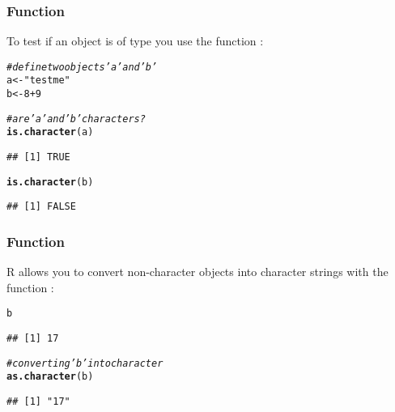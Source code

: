 \documentclass[12pt]{beamer}\usepackage[]{graphicx}\usepackage[]{color}
\makeatletter
\newcommand{\hlnum}[1]{\textcolor[rgb]{0.686,0.059,0.569}{#1}}%
\newcommand{\hlstr}[1]{\textcolor[rgb]{0.192,0.494,0.8}{#1}}%
\newcommand{\hlcom}[1]{\textcolor[rgb]{0.678,0.584,0.686}{\textit{#1}}}%
\newcommand{\hlopt}[1]{\textcolor[rgb]{0,0,0}{#1}}%
\newcommand{\hlstd}[1]{\textcolor[rgb]{0.345,0.345,0.345}{#1}}%
\newcommand{\hlkwb}[1]{\textcolor[rgb]{0.69,0.353,0.396}{#1}}%
\newcommand{\hlkwd}[1]{\textcolor[rgb]{0.737,0.353,0.396}{\textbf{#1}}}%
\newenvironment{kframe}{%
 \def\at@end@of@kframe{}%
 \ifinner\ifhmode%
  \def\at@end@of@kframe{\end{minipage}}%
  \begin{minipage}{\columnwidth}%
 \fi\fi%
 \def\FrameCommand##1{\hskip\@totalleftmargin \hskip-\fboxsep
 \colorbox{shadecolor}{##1}\hskip-\fboxsep
     \hskip-\linewidth \hskip-\@totalleftmargin \hskip\columnwidth}%
 \MakeFramed {\advance\hsize-\width
   \@totalleftmargin\z@ \linewidth\hsize
   \@setminipage}}%
 {\par\unskip\endMakeFramed%
 \at@end@of@kframe}
\newenvironment{knitrout}{}{} %
\makeatother
\begin{document}

\begin{frame}[fragile]
\frametitle{Function }

To test if an object is of type  you use the function :
\begin{knitrout}\footnotesize
{}\color{fgcolor}\begin{kframe}
\begin{alltt}
\hlcom{# define two objects 'a' and 'b'}
\hlstd{a} \hlkwb{<-} \hlstr{"test me"}
\hlstd{b} \hlkwb{<-} \hlnum{8} \hlopt{+} \hlnum{9}

\hlcom{# are 'a' and 'b' characters?}
\hlkwd{is.character}\hlstd{(a)}
\end{alltt}
\begin{verbatim}
## [1] TRUE
\end{verbatim}
\begin{alltt}
\hlkwd{is.character}\hlstd{(b)}
\end{alltt}
\begin{verbatim}
## [1] FALSE
\end{verbatim}
\end{kframe}
\end{knitrout}

\end{frame}


\begin{frame}[fragile]
\frametitle{Function }

R allows you to convert non-character objects into character strings with the function :
\begin{knitrout}\footnotesize
{}\color{fgcolor}\begin{kframe}
\begin{alltt}
\hlstd{b}
\end{alltt}
\begin{verbatim}
## [1] 17
\end{verbatim}
\begin{alltt}
\hlcom{# converting 'b' into character}
\hlkwd{as.character}\hlstd{(b)}
\end{alltt}
\begin{verbatim}
## [1] "17"
\end{verbatim}
\end{kframe}
\end{knitrout}

\end{frame}
\end{document}

